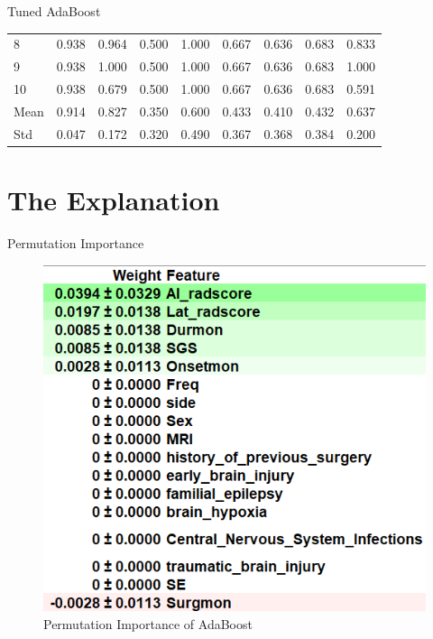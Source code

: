 \documentclass[
  10pt,
  ignorenonframetext,
  fontset=fandol]{beamer}
\begin{document}
\begin{frame}{Tuned AdaBoost}
\begin{table}[]
\begin{tabular}{lllllllll}
8                              & 0.938                        & 0.964                   & 0.500                      & 1.000                     & 0.667                  & 0.636                     & 0.683                   & 0.833                   \\
9                              & 0.938                        & 1.000                   & 0.500                      & 1.000                     & 0.667                  & 0.636                     & 0.683                   & 1.000                   \\
10                             & 0.938                        & 0.679                   & 0.500                      & 1.000                     & 0.667                  & 0.636                     & 0.683                   & 0.591                   \\
Mean                           & 0.914                        & 0.827                   & 0.350                      & 0.600                     & 0.433                  & 0.410                     & 0.432                   & 0.637                   \\
Std                            & 0.047                        & 0.172                   & 0.320                      & 0.490                     & 0.367                  & 0.368                     & 0.384                   & 0.200       \\ \hline           
\end{tabular}
\end{table}
\end{frame}

\hypertarget{the-explanation}{%
\section{The Explanation}\label{the-explanation}}

\begin{frame}{Permutation Importance}
\protect\hypertarget{permutation-importance}{}
\begin{figure}

{\centering \includegraphics[width=0.6\linewidth]{images/eli5} 

}

\caption{Permutation Importance of AdaBoost}\label{fig:unnamed-chunk-7}
\end{figure}
\end{frame}
\end{document}
